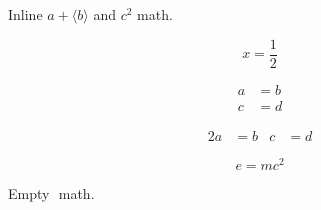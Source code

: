 \documentclass{article}
\newcommand{\avg}[1]{\langle #1 \rangle}
\begin{document}
Inline $a + \avg{b}$ and \(c^2\) math.

\[
  x = \frac{1}{2}
\]

\begin{align*}
  a &= b \label{eq:a} \\
  c &= d \nonumber
\end{align*}

\begin{alignat}{2}
  a &= b & c &= d
\end{alignat}

\begin{equation}
  \tag{*} e = mc^2
\end{equation}

Empty $ $ math.
\end{document}
